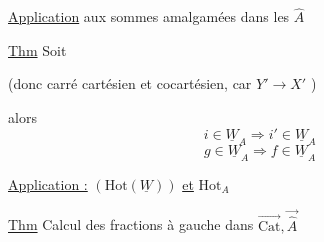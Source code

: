  \uline{Application} aux sommes amalgamées dans les $\widehat A$

\uline{Thm} Soit

(donc carré cartésien et cocartésien, car $Y'\longrightarrow X'$ )


alors 
\[
i\in\underline W_A\Rightarrow i'\in\underline W_A
\]
\[
g\in\underline W_A\Rightarrow f\in\underline W_A
\]

 \uline{Application :} $(\mathrm{Hot}(\underline W))$ \uline{et} $\mathrm{Hot}_A$

\uline{Thm} Calcul des fractions à gauche dans $\overrightarrow{\mathrm{Cat}},\overrightarrow{\widehat A}$
